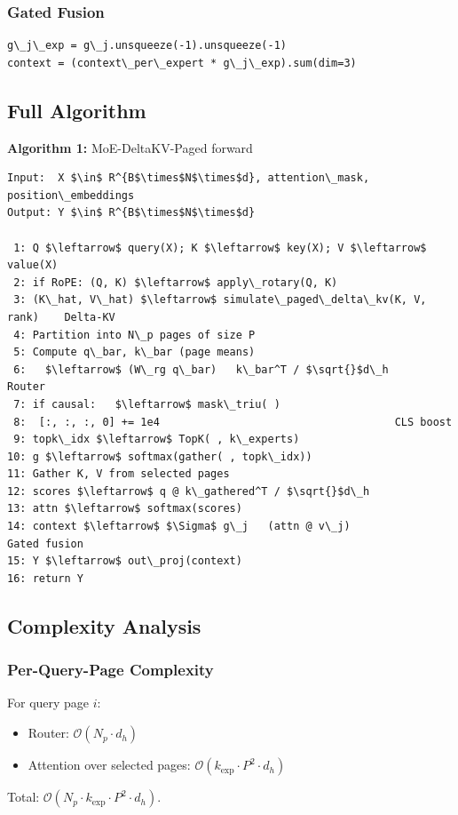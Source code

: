 \subsubsection{Gated Fusion}

\begin{lstlisting}
g\_j\_exp = g\_j.unsqueeze(-1).unsqueeze(-1)
context = (context\_per\_expert * g\_j\_exp).sum(dim=3)
\end{lstlisting}

\subsection{Full Algorithm}

\textbf{Algorithm 1:} MoE-DeltaKV-Paged forward
\begin{lstlisting}
Input:  X $\in$ R^{B$\times$N$\times$d}, attention\_mask, position\_embeddings
Output: Y $\in$ R^{B$\times$N$\times$d}

 1: Q $\leftarrow$ query(X); K $\leftarrow$ key(X); V $\leftarrow$ value(X)
 2: if RoPE: (Q, K) $\leftarrow$ apply\_rotary(Q, K)
 3: (K\_hat, V\_hat) $\leftarrow$ simulate\_paged\_delta\_kv(K, V, rank)    Delta-KV
 4: Partition into N\_p pages of size P
 5: Compute q\_bar, k\_bar (page means)
 6:   $\leftarrow$ (W\_rg q\_bar)   k\_bar^T / $\sqrt{}$d\_h                      Router
 7: if causal:   $\leftarrow$ mask\_triu( )
 8:  [:, :, :, 0] += 1e4                                     CLS boost
 9: topk\_idx $\leftarrow$ TopK( , k\_experts)
10: g $\leftarrow$ softmax(gather( , topk\_idx))
11: Gather K, V from selected pages
12: scores $\leftarrow$ q @ k\_gathered^T / $\sqrt{}$d\_h
13: attn $\leftarrow$ softmax(scores)
14: context $\leftarrow$ $\Sigma$ g\_j   (attn @ v\_j)                          Gated fusion
15: Y $\leftarrow$ out\_proj(context)
16: return Y
\end{lstlisting}

\subsection{Complexity Analysis}

\subsubsection{Per-Query-Page Complexity}

For query page $i$:
\begin{itemize}
\item Router: $\mathcal{O}(N_p \cdot d_h)$
\item Attention over selected pages: $\mathcal{O}(k_\text{exp} \cdot P^2 \cdot d_h)$

\end{itemize}
Total: $\mathcal{O}(N_p \cdot k_\text{exp} \cdot P^2 \cdot d_h)$.

